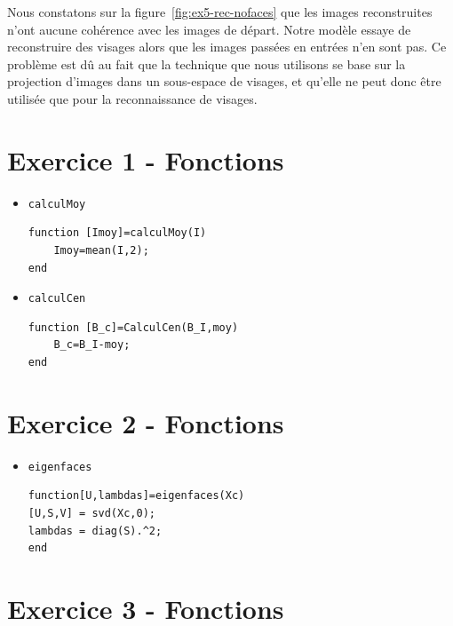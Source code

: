 \documentclass[a4paper]{article}
\newcommand{\figref}[1]{figure~\ref{#1}}
\begin{document}
Nous constatons sur la \figref{fig:ex5-rec-nofaces} que les images reconstruites
n'ont aucune cohérence avec les images de départ. Notre modèle essaye de
reconstruire des visages alors que les images passées en entrées n'en sont pas.
Ce problème est dû au fait que la technique que nous utilisons se base sur la
projection d'images dans un sous-espace de visages, et qu'elle ne peut donc être
utilisée que pour la reconnaissance de visages.

\appendix
\newpage

\section{Exercice 1 - Fonctions}
\label{appendix:ex1}

\begin{itemize}
    \item \texttt{calculMoy}
\begin{lstlisting}[frame=single]
function [Imoy]=calculMoy(I)
    Imoy=mean(I,2);
end
\end{lstlisting}

\item \texttt{calculCen}
\begin{lstlisting}[frame=single]
function [B_c]=CalculCen(B_I,moy)
    B_c=B_I-moy;
end
\end{lstlisting}
\end{itemize}


\section{Exercice 2 - Fonctions}
\label{appendix:ex2}
\begin{itemize}
    \item \texttt{eigenfaces}
\begin{lstlisting}[frame=single]
function[U,lambdas]=eigenfaces(Xc)
[U,S,V] = svd(Xc,0);
lambdas = diag(S).^2;
end
\end{lstlisting}
\end{itemize}

\section{Exercice 3 - Fonctions}
\label{appendix:ex3}
\end{document}
